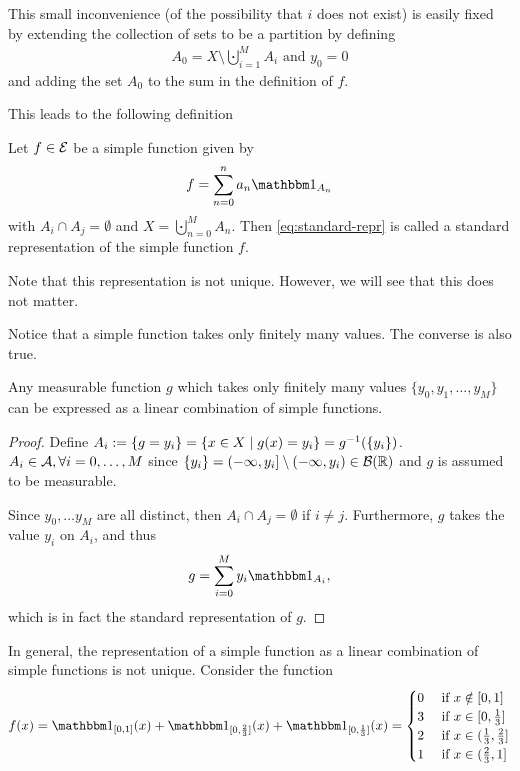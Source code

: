 This small inconvenience (of the possibility that $i$ does not exist) is easily fixed by extending the collection of sets to be a partition by defining
\begin{align*}
	A_0 = X \setminus \bigcupdot_{i = 1}^M A_i \text{ and } y_0 = 0
\end{align*}
and adding the set $A_0$ to the sum in the definition of $f$.

This leads to the following definition
\begin{dfn}
	\label{dfn:standard-representation-simple}
	Let $f \in \mathcal{E}$ be a simple function given by
	\begin{align}
		\label{eq:standard-repr}
		f = \sum_{n = 0}^n a_n \ind_{A_n}
	\end{align}
	with $A_i \cap A_j = \emptyset$ and $X = \bigcupdot_{n = 0}^M A_n$. Then \autoref{eq:standard-repr} is called a standard representation of the simple function $f$.
\end{dfn}

\begin{remark}
	Note that this representation is not unique. However, we will see that this does not matter.
\end{remark}

Notice that a simple function takes only finitely many values. The converse is also true.

\begin{lem}
	Any measurable function $g$ which takes only finitely many values $\{y_0, y_1, \dots, y_M\}$ can be expressed as a linear combination of simple functions.
\end{lem}

\begin{proof}
	Define $A_i := \{g = y_i\} = \{x \in X \mid g(x) = y_i\} = {g}^{-1}(\{y_i\})$. $A_i \in \mathcal{A}, \forall i = 0, \dots, M$ since $\{y_i\} = (-\infty, y_i] \setminus (-\infty, y_i) \in \mathcal{B}(\mathbb{R})$ and $g$ is assumed to be measurable.
	
	Since $y_0, \dots y_M$ are all distinct, then $A_i \cap A_j = \emptyset$ if $i \neq j$. Furthermore, $g$ takes the value $y_i$ on $A_i$, and thus
	\begin{align*}
		g = \sum_{i = 0}^M y_i \ind_{A_i},
	\end{align*}
	which is in fact the standard representation of $g$.
\end{proof}

In general, the representation of a simple function as a linear combination of simple functions is not unique. Consider the function
\begin{align*}
	f(x) = \ind_{[0, 1]}(x) + \ind_{[0, \frac{2}{3}]}(x) + \ind_{[0, \frac{1}{3}]}(x) = \begin{cases}
	0 \tif x \notin [0, 1] \\
	3 \tif x \in [0, \frac{1}{3}] \\
	2 \tif x \in (\frac{1}{3}, \frac{2}{3}] \\
	1 \tif x \in (\frac{2}{3}, 1]
	\end{cases}
\end{align*}

